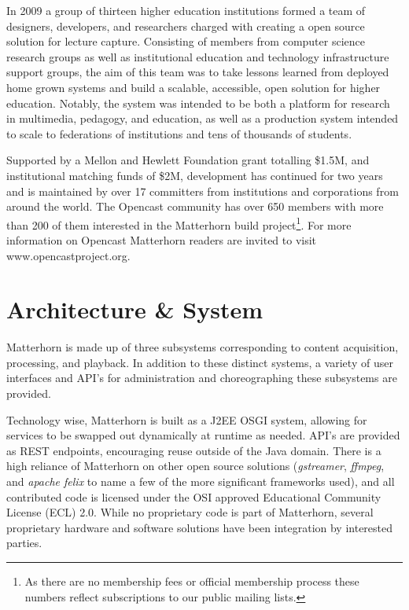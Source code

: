 \documentclass{sig-alternate}
\begin{document}
In 2009 a group of thirteen higher education institutions formed a team of designers, developers, and researchers charged with creating a open source solution for lecture capture.  Consisting of members from computer science research groups as well as institutional education and technology infrastructure support groups, the aim of this team was to take lessons learned from deployed home grown systems and build a scalable, accessible, open solution for higher education.  Notably, the system was intended to be both a platform for research in multimedia, pedagogy, and education, as well as a production system intended to scale to federations of institutions and tens of thousands of students.

Supported by a Mellon and Hewlett Foundation grant totalling \$1.5M, and institutional matching funds of \$2M, development has continued for two years and is maintained by over 17 committers from institutions and corporations from around the world.  The Opencast community has over 650 members with more than 200 of them interested in the Matterhorn build project\footnote{As there are no membership fees or official membership process these numbers reflect subscriptions to our public mailing lists.}.   For more information on Opencast Matterhorn readers are invited to visit www.opencastproject.org.

\section{Architecture \& System}
Matterhorn is made up of three subsystems corresponding to content acquisition, processing, and playback.  In addition to these distinct systems, a variety of user interfaces and API's for administration and choreographing these subsystems are provided.  

Technology wise, Matterhorn is built as a J2EE OSGI system, allowing for services to be swapped out dynamically at runtime as needed.  API's are provided as REST endpoints, encouraging reuse outside of the Java domain.  There is a high reliance of Matterhorn on other open source solutions (\emph{gstreamer}, \emph{ffmpeg}, and \emph{apache felix} to name a few of the more significant frameworks used), and all contributed code is licensed under the OSI approved Educational Community License (ECL) 2.0.  While no proprietary code is part of Matterhorn, several proprietary hardware and software solutions have been integration by interested parties.
\end{document}
